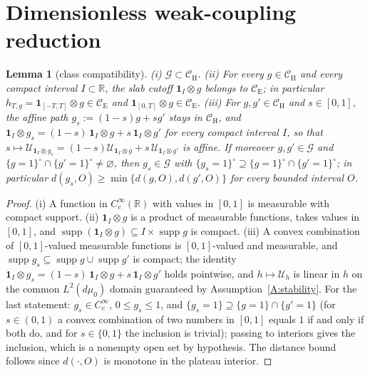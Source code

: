 \documentclass[11pt,a4paper]{article}
\theoremstyle{plain}
\newtheorem{lemma}[theorem]{Lemma}
\theoremstyle{definition}
\theoremstyle{plain}
\theoremstyle{definition}
\newcommand{\R}{\mathbb{R}}
\newcommand{\G}{\mathcal{G}}
\newcommand{\CE}{\mathcal{C}_{\mathrm E}}
\newcommand{\CH}{\mathcal{C}_{\mathrm H}}
\DeclareMathOperator{\supp}{supp}
\begin{document}
\section{Dimensionless weak-coupling reduction}\label{sec:reduction}

\begin{lemma}[class compatibility]\label{lem:classes}
\emph{(i)} $\G\subset\CH$.
\emph{(ii)} For every $g\in\CH$ and every compact interval $I\subset\R$, the slab
cutoff $\mathbf 1_I\otimes g$ belongs to $\CE$; in particular
$h_{T,g}=\mathbf 1_{[-T,T]}\otimes g\in\CE$ and $\mathbf 1_{[0,T]}\otimes g\in\CE$.
\emph{(iii)} For $g,g'\in\CH$ and $s\in[0,1]$, the affine path $g_s:=(1-s)g+sg'$ stays in
$\CH$, and $\mathbf 1_I\otimes g_s=(1-s)\,\mathbf 1_I\otimes g+s\,\mathbf 1_I\otimes g'$
for every compact interval $I$, so that
$s\mapsto\mathcal U_{\mathbf 1_I\otimes g_s}
=(1-s)\mathcal U_{\mathbf 1_I\otimes g}+s\,\mathcal U_{\mathbf 1_I\otimes g'}$ is
affine. If moreover $g,g'\in\G$ and $\{g=1\}^\circ\cap\{g'=1\}^\circ\ne\varnothing$, then
$g_s\in\G$ with $\{g_s=1\}^\circ\supseteq\{g=1\}^\circ\cap\{g'=1\}^\circ$; in particular
$d(g_s,O)\ge\min\{d(g,O),d(g',O)\}$ for every bounded interval $O$.
\end{lemma}

\begin{proof}
(i) A function in $C_c^\infty(\R)$ with values in $[0,1]$ is measurable with compact
support. (ii) $\mathbf 1_I\otimes g$ is a product of measurable functions, takes values
in $[0,1]$, and $\supp(\mathbf 1_I\otimes g)\subseteq I\times\supp g$ is compact.
(iii) A convex combination of
$[0,1]$-valued measurable functions is $[0,1]$-valued and measurable, and
$\supp g_s\subseteq\supp g\cup\supp g'$ is compact; the identity
$\mathbf 1_I\otimes g_s=(1-s)\,\mathbf 1_I\otimes g+s\,\mathbf 1_I\otimes g'$ holds
pointwise, and $h\mapsto\mathcal U_h$ is linear in $h$ on the common $L^2(d\mu_0)$
domain guaranteed by Assumption~\ref{A:stability}. For the last statement:
$g_s\in C_c^\infty$, $0\le g_s\le1$, and
$\{g_s=1\}\supseteq\{g=1\}\cap\{g'=1\}$ (for $s\in(0,1)$ a convex combination of two
numbers in $[0,1]$ equals $1$ if and only if both do, and for $s\in\{0,1\}$ the
inclusion is trivial); passing to interiors gives the inclusion, which is a nonempty open
set by hypothesis. The distance bound follows since
$d(\cdot,O)$ is monotone in the plateau interior.
\end{proof}
\end{document}

